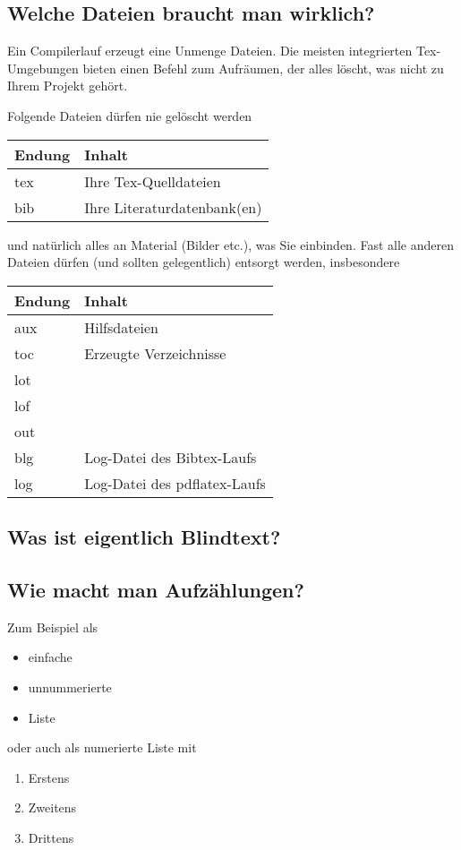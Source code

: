 \subsection{Welche Dateien braucht man wirklich?}
Ein Compilerlauf erzeugt eine Unmenge Dateien. Die meisten integrierten Tex-Umgebungen bieten einen Befehl zum Aufräumen, der alles löscht, was nicht zu Ihrem Projekt gehört.

Folgende Dateien dürfen nie gelöscht werden

\begin{tabu}{|X[0.5] | X[3] |}
\hline
\rowfont{\bfseries} Endung & Inhalt \\
\hline
tex & Ihre Tex-Quelldateien\\
bib & Ihre Literaturdatenbank(en)\\
\hline
\end{tabu}
und natürlich alles an Material (Bilder etc.), was Sie einbinden. Fast alle anderen Dateien dürfen (und sollten gelegentlich) entsorgt werden, insbesondere

\begin{tabu}{|X[0.5] | X[3] |}
\hline
\rowfont{\bfseries} Endung & Inhalt \\
\hline
aux & Hilfsdateien\\
toc & Erzeugte Verzeichnisse\\
lot & \\
lof & \\
out & \\
blg & Log-Datei des Bibtex-Laufs \\
log & Log-Datei des pdflatex-Laufs\\
\hline
\end{tabu}


\subsection{Was ist eigentlich Blindtext?}

\blindtext
\subsection{Wie macht man Aufzählungen?}
Zum Beispiel als
\begin{itemize}
\item einfache
\item unnummerierte
\item Liste
\end{itemize}

oder auch als numerierte Liste mit
\begin{enumerate}
\item Erstens
\item Zweitens 
\item Drittens
\end{enumerate}

